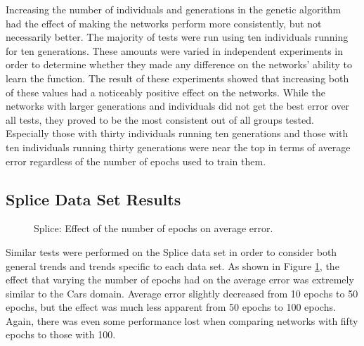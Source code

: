 \documentclass[10pt, conference, compsocconf]{IEEEtran}
\begin{document}
Increasing the number of individuals and generations in the genetic algorithm had the effect of making the networks perform more consistently, but not necessarily better. The majority of tests were run using ten individuals running for ten generations. These amounts were varied in independent experiments in order to determine whether they made any difference on the networks' ability to learn the function. The result of these experiments showed that increasing both of these values had a noticeably positive effect on the networks. While the networks with larger generations and individuals did not get the best error over all tests, they proved to be the most consistent out of all groups tested. Especially those with thirty individuals running ten generations and those with ten individuals running thirty generations were near the top in terms of average error regardless of the number of epochs used to train them.

\subsection{Splice Data Set Results}

\begin{figure}
\begin{center}
\end{center}
\caption{Splice: Effect of the number of epochs on average error.}
\label{fig:SpliceNumEpochs}
\end{figure}

Similar tests were performed on the Splice data set in order to consider both general trends and trends specific to each data set. As shown in Figure \ref{fig:SpliceNumEpochs}, the effect that varying the number of epochs had on the average error was extremely similar to the Cars domain. Average error slightly decreased from 10 epochs to 50 epochs, but the effect was much less apparent from 50 epochs to 100 epochs. Again, there was even some performance lost when comparing networks with fifty epochs to those with 100.
\end{document}

